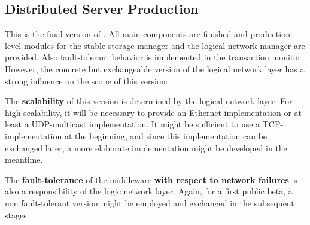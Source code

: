\documentclass[a4paper, 10pt]{book}
\begin{document}
                                        \subsection{Distributed Server Production}
                                        \label{sec:distr-serv-prod}

                                        This is the final version of \SYNEIGHT. All main components are finished
                                        and production level modules for the stable storage manager and the
                                        logical network manager are provided. Also fault-tolerant behavior is
                                        implemented in the transaction monitor. However, the concrete but
                                        exchangeable version of the logical network layer has a strong
                                        influence on the scope of this version: 
                                        \begin{description}
                                            \item The \textbf{scalability} of this version is determined by the
                                                logical network layer. For high scalability, it will be necessary to
                                                provide an Ethernet implementation or at least a UDP-multicast
                                                implementation. It might be sufficient to use a TCP-implementation
                                                at the beginning, and since this implementation can be exchanged
                                                later, a more elaborate implementation might be developed in the
                                                meantime. 
                                            \item The \textbf{fault-tolerance} of the middleware \textbf{with
                                                respect to network failures} is also a responsibility of the logic
                                                network layer. Again, for a first public beta, a non fault-tolerant
                                                version might be employed and exchanged in the subsequent stages.
                                        \end{description}
\end{document}
